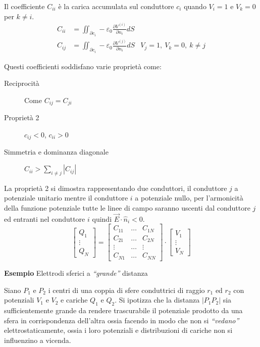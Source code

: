 Il coefficiente $C_{ii}$ è la carica accumulata sul conduttore $c_i$ quando $V_i=1$ e $V_k = 0$
per $k\neq i$.
$$
\begin{aligned}
C_{ii} &= \iint_{\partial c_i} -\varepsilon_0\frac{\partial V^{(i)}}{\partial n_i} dS\\
C_{ij} &= \iint_{\partial c_i} -\varepsilon_0\frac{\partial V^{(j)}}{\partial n_i} dS & V_j = 1,\ 
V_k = 0,\ k\neq j
\end{aligned}
$$

Questi coefficienti soddisfano varie proprietà come:

\begin{description}
 \item[Reciprocità] Come $C_{ij} = C_{ji} $
 \item[Proprietà 2] $c_{ij} < 0 $, $c_{ii}>0$
 \item[Simmetria e dominanza diagonale] $C_{ii} > \sum_{i\neq j}|C_{ij}|$
\end{description}
La proprietà 2 si dimostra rappresentando due conduttori, il conduttore $j$ a 
potenziale unitario mentre il conduttore $i$ a potenziale nullo, per l'armonicità della funzione
potenziale tutte le linee di campo saranno uscenti dal conduttore $j$ ed entranti nel conduttore 
$i$ quindi $\vec{E}\cdot\hat{n}_i < 0$.
$$ %
\begin{bmatrix}
Q_1\\
\vdots \\
Q_N
\end{bmatrix} = 
\begin{bmatrix}
C_{11} & \ldots  & C_{1N} \\
C_{21} & \ldots  & C_{2N} \\
\vdots & \ldots  & \vdots \\
C_{N1} & \ldots  & C_{NN}
\end{bmatrix} \cdot
\begin{bmatrix}
V_1 \\
\vdots \\
V_N
\end{bmatrix}
$$

\textbf{Esempio} Elettrodi sferici a \textit{``grande''} distanza

Siano $P_1$ e $P_2$ i centri di una coppia di sfere conduttrici di raggio $r_1$ ed $r_2$ con potenziali $V_1$ e
$V_2$ e cariche $Q_1$ e $Q_2$.
Si ipotizza che la distanza $|P_1P_2|$ sia sufficientemente grande da rendere trascurabile il potenziale
prodotto da una sfera in corrispondenza dell'altra ossia facendo in modo che non si \textit{``vedano''} 
elettrostaticamente, ossia i loro potenziali e distribuzioni di cariche non si influenzino a vicenda.

